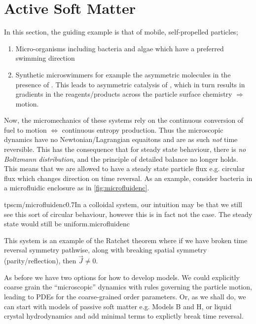 \section{Active Soft Matter}
In this section, the guiding example is that of mobile, self-propelled particles;
\begin{enumerate}
\item Micro-organisms including bacteria and algae which have a preferred swimming direction
\item Synthetic microswimmers for example the asymmetric  molecules in the presence of . This leads to asymmetric catalysis of , which in turn results in gradients in the reagents/products across the particle surface chemistry $\Rightarrow$ motion.
\end{enumerate}
Now, the micromechanics of these systems rely on the continuous conversion of fuel to motion $\iff$ continuous entropy production. Thus the microscopic dynamics have no Newtonian/Lagrangian equaitons and are as such \emph{not} time reversible. This has the consequence that for steady state behaviour, there is \emph{no Boltzmann distribution}, and the principle of detailed balance no longer holds. This means that we are allowed to have a steady state particle flux e.g. circular flux which changes direction on time reversal. As an example, consider bacteria in a microfluidic enclosure as in \autoref{fig:microfluidenc}.
\begin{mygraphic}{tpscm/microfluidenc}{0.7}{In a colloidal system, our intuition may be that we still see this sort of circular behaviour, however this is in fact not the case. The steady state would still be uniform.}{microfluidenc}\end{mygraphic}
This system is an example of the Ratchet theorem where if we have broken time reversal symmetry pathwise, along with breaking spatial symmetry (parity/reflection), then $\vec{J} \neq 0$.

\paraskip 
As before we have two options for how to develop models. We could explicitly coarse grain the ``microscopic'' dynamics with rules governing the particle motion, leading to PDEs for the coarse-grained order parameters. Or, as we shall do, we can start with models of passive soft matter e.g. Models B and H, or liquid crystal hydrodynamics and add minimal terms to explictly break time reversal.

